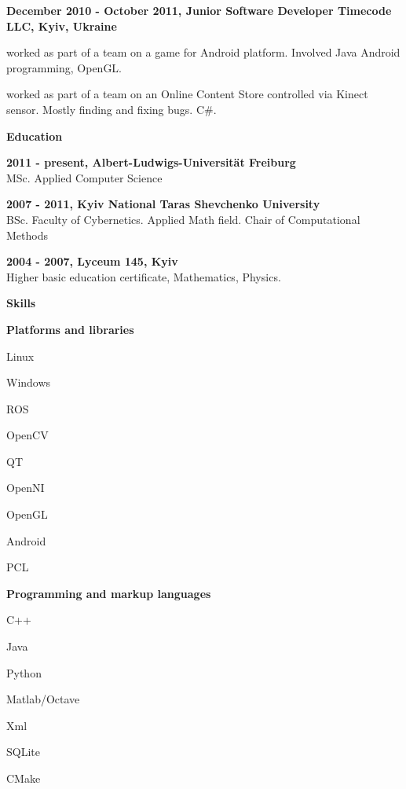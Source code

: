 \documentclass[a4paper,12pt,final]{memoir}
\newcommand{\Sep}{\vspace{1.5em}}
\newcommand{\SmallSep}{\vspace{0.5em}}
\newcommand{\CVSection}[1]
	{\Large\textbf{#1}\par
	\SmallSep\normalsize\normalfont}
\newcommand{\CVItem}[1]
	{\textbf{\color{MidnightBlue} #1}}
\begin{document}
\CVItem{December 2010 - October 2011, Junior Software Developer
\newline Timecode LLC, Kyiv, Ukraine}
\begin{compactitem}[\color{MidnightBlue}$\circ$]
\item worked as part of a team on a game for Android platform. Involved Java Android programming, OpenGL.
\item worked as part of a team on an Online Content Store controlled via Kinect sensor. Mostly finding and fixing bugs. C\#.
\end{compactitem}
\Sep
\framebreak
\clearpage
\framebreak
\framebreak

\CVSection{Education}
\CVItem{2011 - present, Albert-Ludwigs-Universität Freiburg}\\
MSc. Applied Computer Science
\SmallSep

\CVItem{2007 - 2011, Kyiv National Taras Shevchenko University}\\
BSc. Faculty of Cybernetics. Applied Math field.
\newline Chair of Computational Methods
\SmallSep

\CVItem{2004 - 2007, Lyceum 145, Kyiv}\\
Higher basic education certificate, Mathematics, Physics.
\Sep

\CVSection{Skills}
\CVItem{Platforms and libraries}
\begin{multicols}{3}
\begin{compactitem}[\color{MidnightBlue}$\circ$]
	\item Linux
	\item Windows
	\item ROS
	\item OpenCV
	\item QT
	\item OpenNI
	\item OpenGL
	\item Android
	\item PCL
\end{compactitem}
\end{multicols}
\SmallSep

\CVItem{Programming and markup languages}
\begin{multicols}{3}
\begin{compactitem}[\color{MidnightBlue}$\circ$]
	\item C++
	\item Java
	\item Python
	\item Matlab/Octave
	\item Xml
	\item SQLite
	\item CMake
\end{compactitem}
\end{multicols}
\SmallSep
\end{document}
